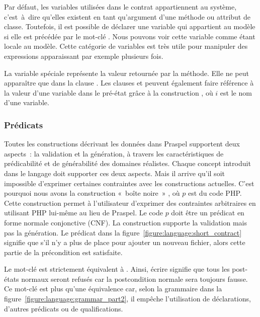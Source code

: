 Par défaut, les variables utilisées dans le contrat appartiennent au système,
c'est~à~dire qu'elles existent en tant qu'argument d'une méthode ou attribut de
classe. Toutefois, il est possible de déclarer une variable qui appartient au
modèle si elle est précédée par le mot-clé . Nous pouvons voir cette
variable comme étant {\strong locale} au modèle. Cette catégorie de variables
est très utile pour manipuler des expressions apparaissant par exemple plusieurs
fois.

La variable spéciale \aresult représente la valeur {\strong retournée} par la
méthode. Elle ne peut apparaître que dans la clause \aensures. Les clauses
\aensures et \athrowable peuvent également faire {\strong référence} à la valeur
d'une variable dans le pré-état grâce à la construction , où $i$ est le
nom d'une variable.

\subsubsection{Prédicats}

Toutes les constructions décrivant les données dans Praspel supportent deux
aspects~: la validation et la génération, à travers les caractéristiques de
prédicabilité et de générabilité des domaines réalistes. Chaque concept
introduit dans le langage doit supporter ces deux aspects. Mais il arrive qu'il
soit impossible d'exprimer certaines contraintes avec les constructions
actuelles. C'est pourquoi nous avons la construction «~boîte noire~» ,
où $p$ est du code PHP. Cette construction permet à l'utilisateur d'exprimer des
contraintes arbitraires en utilisant PHP lui-même au lieu de Praspel. Le code
$p$ doit être un prédicat en forme normale {\strong conjonctive} (CNF). La
construction  supporte la validation mais pas la génération.  Le
prédicat  dans la figure~\ref{figure:language:short_contract} signifie
que s'il n'y a plus de place pour ajouter un nouveau fichier, alors cette partie
de la précondition est satisfaite.

Le mot-clé \anone est strictement équivalent à .  Ainsi,
écrire \code{\aensures \anone;} signifie que tous les post-états normaux seront
refusés car la postcondition normale sera toujours fausse. Ce mot-clé est plus
qu'une équivalence car, selon la grammaire dans la
figure~\ref{figure:language:grammar_part2}, il empêche l'utilisation de
déclarations, d'autres prédicats ou de qualifications.

